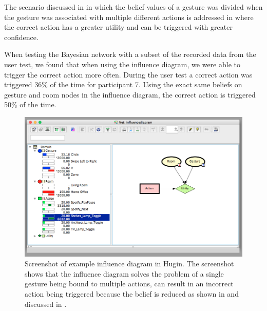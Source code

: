 The scenario discussed in  in which the belief values of a gesture was divided when the gesture was associated with multiple different actions is addressed in  where the correct action has a greater utility and can be triggered with greater confidence.

When testing the Bayesian network with a subset of the recorded data from the user test, we found that when using the influence diagram, we were able to trigger the correct action more often. During the user test a correct action was triggered 36\% of the time for participant 7. Using the exact same beliefs on gesture and room nodes in the influence diagram, the correct action is triggered 50\% of the time.


\begin{figure}[h]
\centering
\includegraphics[width=\textwidth]{images/hugin-influence-diagram}
\caption{Screenshot of example influence diagram in Hugin. The screenshot shows that the influence diagram solves the problem of a single gesture being bound to multiple actions, can result in an incorrect action being triggered because the belief is reduced as shown in  and discussed in .}
\label{fig:evaluation:alternative-models:hugin-influence-diagram}
\end{figure}

